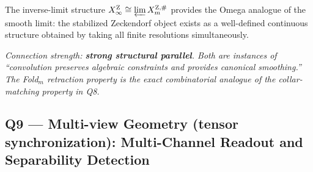 \begin{remark}
The inverse-limit structure $X_\infty^{\mathrm Z}
\cong\varprojlim X_m^{\mathrm Z,\#}$ provides the Omega analogue
of the smooth limit: the stabilized Zeckendorf object exists as a
well-defined continuous structure obtained by taking all finite
resolutions simultaneously.

\emph{Connection strength: \textbf{strong structural parallel}.
Both are instances of ``convolution preserves algebraic constraints
and provides canonical smoothing.''  The Fold$_m$ retraction property
is the exact combinatorial analogue of the collar-matching property
in Q8.}
\end{remark}


\subsection{Q9 --- Multi-view Geometry (tensor synchronization):
  Multi-Channel Readout and Separability Detection}
\label{ss:omega-q9}

